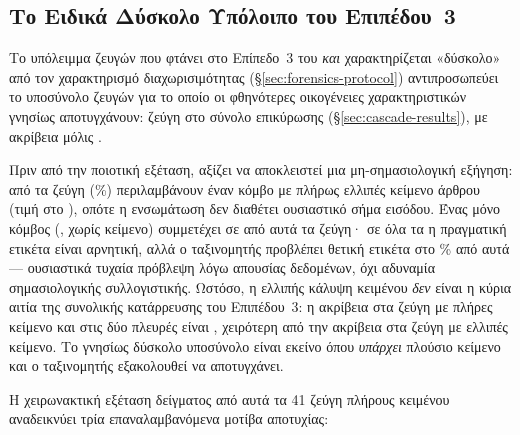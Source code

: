 \subsection{Το Ειδικά Δύσκολο Υπόλοιπο του Επιπέδου~3}
\label{sec:tier3-hard-residual}

Το υπόλειμμα ζευγών που φτάνει στο Επίπεδο~3 του  \textit{και}
χαρακτηρίζεται «δύσκολο» από τον χαρακτηρισμό διαχωρισιμότητας
(\S\ref{sec:forensics-protocol}) αντιπροσωπεύει το υποσύνολο ζευγών για το οποίο
οι φθηνότερες οικογένειες χαρακτηριστικών γνησίως αποτυγχάνουν: \HardResCount{} ζεύγη στο σύνολο
επικύρωσης (\S\ref{sec:cascade-results}), με ακρίβεια μόλις \HardResAcc{}.

Πριν από την ποιοτική εξέταση, αξίζει να αποκλειστεί μια μη-σημασιολογική εξήγηση: \HardResMissingN{}
από τα \HardResCount{} ζεύγη (\HardResMissingPct\%) περιλαμβάνουν έναν κόμβο με πλήρως ελλιπές κείμενο άρθρου
(τιμή  στο \texttt{}), οπότε η ενσωμάτωση 
δεν διαθέτει ουσιαστικό σήμα εισόδου.
Ένας μόνο κόμβος (\texttt{}, χωρίς
κείμενο) συμμετέχει σε \HardResNodePairs{} από αυτά τα ζεύγη· σε όλα τα \HardResNodePairs{} η πραγματική ετικέτα είναι
αρνητική, αλλά ο ταξινομητής προβλέπει θετική ετικέτα στο \HardResNodePredPosPct\% από αυτά ---
ουσιαστικά τυχαία πρόβλεψη λόγω απουσίας δεδομένων, όχι αδυναμία σημασιολογικής
συλλογιστικής.
Ωστόσο, η ελλιπής κάλυψη κειμένου \textit{δεν} είναι η κύρια αιτία της
συνολικής κατάρρευσης του Επιπέδου~3: η ακρίβεια στα \HardResCompleteN{} ζεύγη με πλήρες κείμενο και
στις δύο πλευρές είναι \HardResCompleteAcc{}, χειρότερη από την ακρίβεια \HardResIncompleteAcc{} στα \HardResMissingN{} ζεύγη με
ελλιπές κείμενο.
Το γνησίως δύσκολο υποσύνολο είναι εκείνο όπου \textit{υπάρχει}
πλούσιο κείμενο και ο ταξινομητής εξακολουθεί να αποτυγχάνει.

Η χειρωνακτική εξέταση δείγματος από αυτά τα 41 ζεύγη πλήρους κειμένου αναδεικνύει
τρία επαναλαμβανόμενα μοτίβα αποτυχίας:

